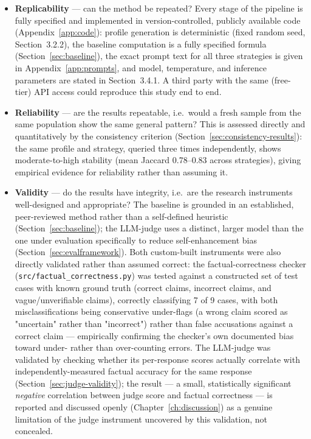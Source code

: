 \begin{itemize}
    \item \textbf{Replicability} --- can the method be repeated? Every stage of the pipeline is fully specified and implemented in version-controlled, publicly available code (Appendix~\ref{app:code}): profile generation is deterministic (fixed random seed, Section~3.2.2), the baseline computation is a fully specified formula (Section~\ref{sec:baseline}), the exact prompt text for all three strategies is given in Appendix~\ref{app:prompts}, and model, temperature, and inference parameters are stated in Section~3.4.1. A third party with the same (free-tier) API access could reproduce this study end to end.
    \item \textbf{Reliability} --- are the results repeatable, i.e.\ would a fresh sample from the same population show the same general pattern? This is assessed directly and quantitatively by the consistency criterion (Section~\ref{sec:consistency-results}): the same profile and strategy, queried three times independently, shows moderate-to-high stability (mean Jaccard 0.78--0.83 across strategies), giving empirical evidence for reliability rather than assuming it.
    \item \textbf{Validity} --- do the results have integrity, i.e.\ are the research instruments well-designed and appropriate? The baseline is grounded in an established, peer-reviewed method rather than a self-defined heuristic (Section~\ref{sec:baseline}); the LLM-judge uses a distinct, larger model than the one under evaluation specifically to reduce self-enhancement bias (Section~\ref{sec:evalframework}). Both custom-built instruments were also directly validated rather than assumed correct: the factual-correctness checker (\texttt{src/factual\_correctness.py}) was tested against a constructed set of test cases with known ground truth (correct claims, incorrect claims, and vague/unverifiable claims), correctly classifying 7 of 9 cases, with both misclassifications being conservative under-flags (a wrong claim scored as "uncertain" rather than "incorrect") rather than false accusations against a correct claim --- empirically confirming the checker's own documented bias toward under- rather than over-counting errors. The LLM-judge was validated by checking whether its per-response scores actually correlate with independently-measured factual accuracy for the same response (Section~\ref{sec:judge-validity}); the result --- a small, statistically significant \textit{negative} correlation between judge score and factual correctness --- is reported and discussed openly (Chapter~\ref{ch:discussion}) as a genuine limitation of the judge instrument uncovered by this validation, not concealed.

\end{itemize}
